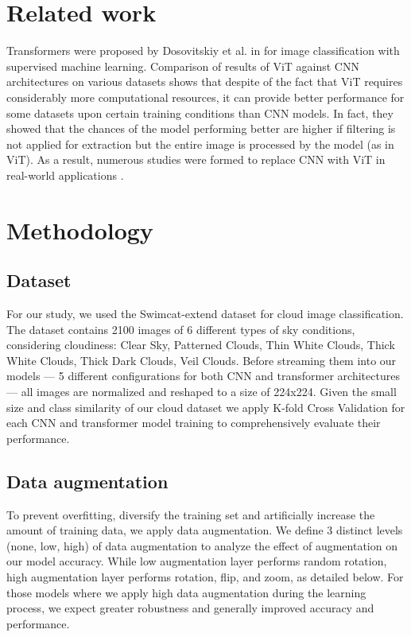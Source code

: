 \documentclass{article}
\begin{document}
\section{Related work}
Transformers were proposed by Dosovitskiy et al. in \cite{Dosovitskiy2021} for image classification with supervised machine learning. Comparison of results of ViT against CNN architectures on various datasets shows that despite of the fact that ViT requires considerably more computational resources, it can provide better performance for some datasets upon certain training conditions than CNN models. In fact, they showed that the chances of the model performing better are higher if filtering is not applied for extraction but the entire image is processed by the model (as in ViT). As a result, numerous studies were formed to replace CNN with ViT in real-world applications \cite{Bazi2021,Karimi2021}.

\section{Methodology\label{sec:meth}}
\subsection{Dataset}
For our study, we used the Swimcat-extend dataset \cite{Swimcat2020} for cloud image classification. The dataset contains 2100 images of 6 different types of sky conditions, considering cloudiness: Clear Sky, Patterned Clouds, Thin White Clouds, Thick White Clouds, Thick Dark Clouds, Veil Clouds. Before streaming them into our models --- 5 different configurations for both CNN and transformer architectures --- all images are normalized and reshaped to a size of 224x224. Given the small size and class similarity of our cloud dataset we apply K-fold Cross Validation for each CNN and transformer model training to comprehensively evaluate their performance.

\subsection{Data augmentation}
To prevent overfitting, diversify the training set and artificially increase the amount of training data, we apply data augmentation. We define 3 distinct levels (none, low, high) of data augmentation to analyze the effect of augmentation on our model accuracy. While low augmentation layer performs random rotation, high augmentation layer performs rotation, flip, and zoom, as detailed below. For those models where we apply high data augmentation during the learning process, we expect greater robustness and generally improved accuracy and performance. 
\end{document}
